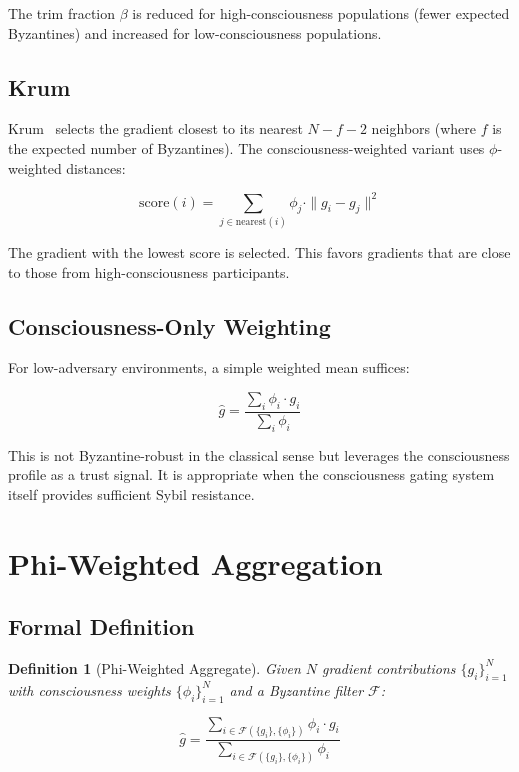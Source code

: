 \documentclass[11pt,twocolumn]{article}
\newtheorem{definition}{Definition}
\begin{document}
The trim fraction $\beta$ is reduced for high-consciousness populations
(fewer expected Byzantines) and increased for low-consciousness populations.

\subsection{Krum}

Krum~\cite{blanchard2017} selects the gradient closest to its nearest
$N - f - 2$ neighbors (where $f$ is the expected number of Byzantines).
The consciousness-weighted variant uses $\phi$-weighted distances:

\begin{equation}
  \text{score}(i) = \sum_{j \in \text{nearest}(i)} \phi_j \cdot \|g_i - g_j\|^2
\end{equation}

The gradient with the lowest score is selected. This favors gradients
that are close to those from high-consciousness participants.

\subsection{Consciousness-Only Weighting}

For low-adversary environments, a simple weighted mean suffices:

\begin{equation}
  \hat{g} = \frac{\sum_{i} \phi_i \cdot g_i}{\sum_{i} \phi_i}
\end{equation}

This is not Byzantine-robust in the classical sense but leverages the
consciousness profile as a trust signal. It is appropriate when the
consciousness gating system itself provides sufficient Sybil resistance.

\section{Phi-Weighted Aggregation}

\subsection{Formal Definition}

\begin{definition}[Phi-Weighted Aggregate]
Given $N$ gradient contributions $\{g_i\}_{i=1}^N$ with consciousness
weights $\{\phi_i\}_{i=1}^N$ and a Byzantine filter $\mathcal{F}$:

\begin{equation}
  \hat{g} = \frac{\sum_{i \in \mathcal{F}(\{g_i\}, \{\phi_i\})} \phi_i \cdot g_i}
    {\sum_{i \in \mathcal{F}(\{g_i\}, \{\phi_i\})} \phi_i}
\end{equation}
\end{definition}
\end{document}
